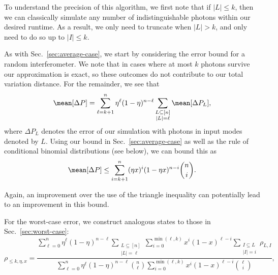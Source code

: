 To understand the precision of this algorithm, we first note that if $|L|\leq k$, then we can classically simulate any number of indistinguishable photons within our desired runtime. 
As a result, we only need to truncate when $|L|>k$, and only need to do so up to $|I|\leq k$. 

As with Sec.\ \ref{sec:average-case}, we start by considering the error bound for a random interferometer. We note that in cases where at most $k$ photons survive our approximation is exact, so these outcomes do not contribute to our total variation distance. 
For the remainder, we see that
\begin{equation}
\mean[\Delta P] = \sum_{\ell=k+1}^n\eta^\ell(1-\eta)^{n-\ell}\sum_{\substack{L\subseteq[n]\\|L|=\ell}}\mean[\Delta P_L],
\end{equation}
where $\Delta P_L$ denotes the error of our simulation with photons in input modes denoted by $L$. 
Using our bound in Sec.\ \ref{sec:average-case} as well as the rule of conditional binomial distributions (see below), we can bound this as
\begin{equation}
\mean[\Delta P] \leq \sum_{i=k+1}^n(\eta x)^i(1-\eta x)^{n-i}\binom{n}{i}.
\end{equation}

Again, an improvement over the use of the triangle inequality can potentially lead to an improvement in this bound.


For the worst-case error, we construct analogous states to those in Sec.\ \ref{sec:worst-case}:
\begin{equation}
\rho_{\leq k,\eta,x} = \frac{\sum_{\ell=0}^n\eta^\ell(1-\eta)^{n-\ell}\sum_{\substack{L\subseteq[n]\\|L|=\ell}}\sum_{i=0}^{\min(\ell,k)} x^i(1-x)^{\ell-i}\sum_{\substack{I\subseteq L\\|I|=i}}\rho_{L,I}}{\sum_{\ell=0}^n\eta^\ell(1-\eta)^{n-\ell}\binom{n}{\ell}\sum_{i=0}^{\min(\ell,k)} x^i(1-x)^{\ell-i}\binom{\ell}{i}},
\end{equation}

